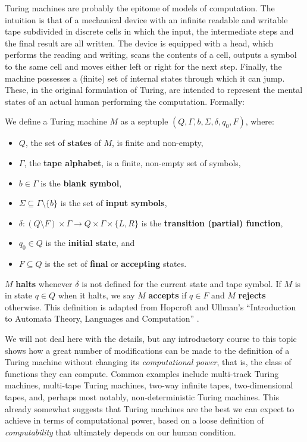 \documentclass[../main.tex]{memoir}
\begin{document}
Turing machines are probably the epitome of models of computation. The intuition is that of a mechanical device with an infinite readable and writable tape subdivided in discrete cells in which the input, the intermediate steps and the final result are all written. The device is equipped with a head, which performs the reading and writing, scans the contents of a cell, outputs a symbol to the same cell and moves either left or right for the next step. Finally, the machine possesses a (finite) set of internal states through which it can jump. These, in the original formulation of Turing, are intended to represent the mental states of an actual human performing the computation. Formally:

\begin{definition}
  \label{def:turing-machine}
  We define a Turing machine $M$ as a septuple $(Q, \Gamma, b, \Sigma, \delta, q_0, F)$, where:

  \begin{itemize}
  \item $Q$, the set of \textbf{states} of $M$, is finite and non-empty,
  \item $\Gamma$, the \textbf{tape alphabet}, is a finite, non-empty set of symbols,
  \item $b \in \Gamma$ is the \textbf{blank symbol},
  \item $\Sigma \subseteq \Gamma \setminus \{b\}$ is the set of \textbf{input symbols},
  \item $\delta: (Q \setminus F) \times \Gamma \to Q \times \Gamma \times \{L, R\}$ is the \textbf{transition (partial) function},
  \item $q_0 \in Q$ is the \textbf{initial state}, and
  \item $F \subseteq Q$ is the set of \textbf{final} or \textbf{accepting} states.
  \end{itemize}
\end{definition}

$M$ \textbf{halts} whenever $\delta$ is not defined for the current state and tape symbol. If $M$ is in state $q \in Q$ when it halts, we say $M$ \textbf{accepts} if $q \in F$ and $M$ \textbf{rejects} otherwise. This definition is adapted from Hopcroft and Ullman's ``Introduction to Automata Theory, Languages and Computation'' \cite{hopcroft}.

We will not deal here with the details, but any introductory course to this topic shows how a great number of modifications can be made to the definition of a Turing machine without changing its \textit{computational power}, that is, the class of functions they can compute. Common examples include multi-track Turing machines, multi-tape Turing machines, two-way infinite tapes, two-dimensional tapes, and, perhaps most notably, non-deterministic Turing machines. This already somewhat suggests that Turing machines are the best we can expect to achieve in terms of computational power, based on a loose definition of \textit{computability} that ultimately depends on our human condition.
\end{document}
